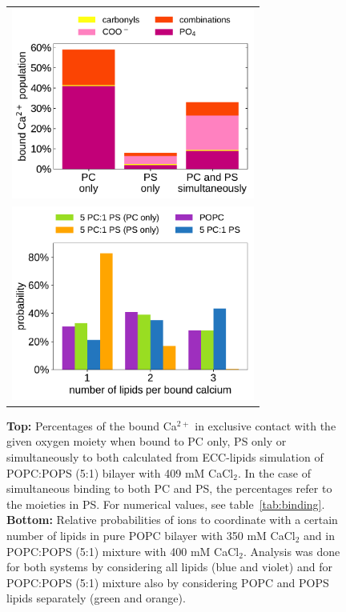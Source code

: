 \documentclass[journal=jpcbfk,manuscript=article]{achemso}
\begin{document}
\begin{figure}[tbp!] 
  \centering 
  \begin{tabular}{ c }
  \includegraphics[width=8cm]{../img/bound_ca_populations.pdf} \\
  \includegraphics[width=8cm]{../img/stoichiometry_CaCl2_comparison_Ecc-lipids_PC-vs-PCPS.pdf} 
  \end{tabular}
  \caption{ \label{fig:cacl_complexes} 
    \textbf{Top:} Percentages of the bound Ca$^{2+}$ 
    in exclusive contact with the given oxygen moiety
    when bound to PC only, PS only or simultaneously to both
    calculated from ECC-lipids simulation of POPC:POPS (5:1) bilayer with 409 mM CaCl$_2$. 
	In the case of simultaneous binding to both PC and PS,
	the percentages refer to the moieties in PS.
        For numerical values, see table~\ref{tab:binding}.
    \textbf{Bottom:} Relative probabilities of  ions to coordinate with a certain number of lipids
    in pure POPC bilayer with 350 mM CaCl$_2$ and in POPC:POPS (5:1) mixture with 400 mM CaCl$_2$.  
    Analysis was done for both systems by considering all lipids (blue and violet) and
    for POPC:POPS (5:1) mixture also by considering POPC and POPS lipids separately (green and orange). 
}
\end{figure}
\end{document}

